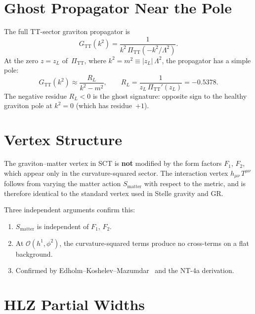 \documentclass[11pt,a4paper]{article}
\newcommand{\PiTT}{\Pi_{\mathrm{TT}}}
\newcommand{\order}{\mathcal{O}}
\begin{document}
\section{Ghost Propagator Near the Pole}
\label{sec:pole}

The full TT-sector graviton propagator is
\begin{equation}\label{eq:G}
  G_{\mathrm{TT}}(k^2)
  = \frac{1}{k^2\,\PiTT(-k^2/\Lambda^2)}.
\end{equation}
At the zero $z = z_L$ of~$\PiTT$, where $k^2 = m^2 \equiv
|z_L|\,\Lambda^2$, the propagator has a simple pole:
\begin{equation}\label{eq:pole}
  G_{\mathrm{TT}}(k^2)
  \approx \frac{R_L}{k^2 - m^2},
  \qquad
  R_L = \frac{1}{z_L\,\PiTT'(z_L)} = -0.5378.
\end{equation}
The negative residue $R_L < 0$ is the ghost signature: opposite sign
to the healthy graviton pole at $k^2 = 0$ (which has residue~$+1$).


\section{Vertex Structure}
\label{sec:vertex}

The graviton--matter vertex in SCT is \textbf{not} modified by the form
factors $F_1$, $F_2$, which appear only in the curvature-squared sector.
The interaction vertex $h_{\mu\nu}\,T^{\mu\nu}$ follows from varying the
matter action $S_{\mathrm{matter}}$ with respect to the metric, and is
therefore identical to the standard vertex used in Stelle gravity and GR.

Three independent arguments confirm this:
\begin{enumerate}[nosep]
  \item $S_{\mathrm{matter}}$ is independent of $F_1$, $F_2$.
  \item At $\order(h^1, \phi^2)$, the curvature-squared terms produce
    no cross-terms on a flat background.
  \item Confirmed by Edholm--Koshelev--Mazumdar~\cite{EKM2025} and the
    NT-4a derivation.
\end{enumerate}


\section{HLZ Partial Widths}
\label{sec:hlz}
\end{document}
